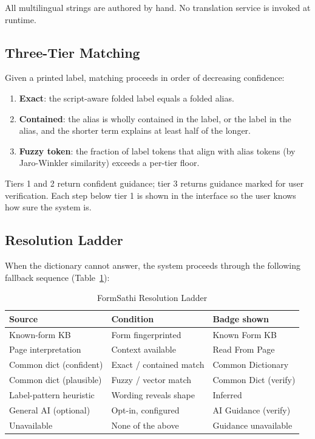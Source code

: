\documentclass[conference]{IEEEtran}
\begin{document}
All multilingual strings are authored by hand. No translation service is invoked at runtime.

\subsection{Three-Tier Matching}

Given a printed label, matching proceeds in order of decreasing confidence:
\begin{enumerate}
  \item \textbf{Exact}: the script-aware folded label equals a folded alias.
  \item \textbf{Contained}: the alias is wholly contained in the label, or the label in the alias, and the shorter term explains at least half of the longer.
  \item \textbf{Fuzzy token}: the fraction of label tokens that align with alias tokens (by Jaro-Winkler similarity) exceeds a per-tier floor.
\end{enumerate}

Tiers 1 and 2 return confident guidance; tier 3 returns guidance marked for user verification. Each step below tier 1 is shown in the interface so the user knows how sure the system is.

\subsection{Resolution Ladder}

When the dictionary cannot answer, the system proceeds through the following fallback sequence (Table~\ref{tab:resolution}):

\begin{table}[htbp]
\caption{FormSathi Resolution Ladder}
\label{tab:resolution}
\centering
\small
\begin{tabular}{@{}lll@{}}
\toprule
\textbf{Source} & \textbf{Condition} & \textbf{Badge shown} \\
\midrule
Known-form KB & Form fingerprinted & Known Form KB \\
Page interpretation & Context available & Read From Page \\
Common dict (confident) & Exact / contained match & Common Dictionary \\
Common dict (plausible) & Fuzzy / vector match & Common Dict (verify) \\
Label-pattern heuristic & Wording reveals shape & Inferred \\
General AI (optional) & Opt-in, configured & AI Guidance (verify) \\
Unavailable & None of the above & Guidance unavailable \\
\bottomrule
\end{tabular}
\end{table}
\end{document}
